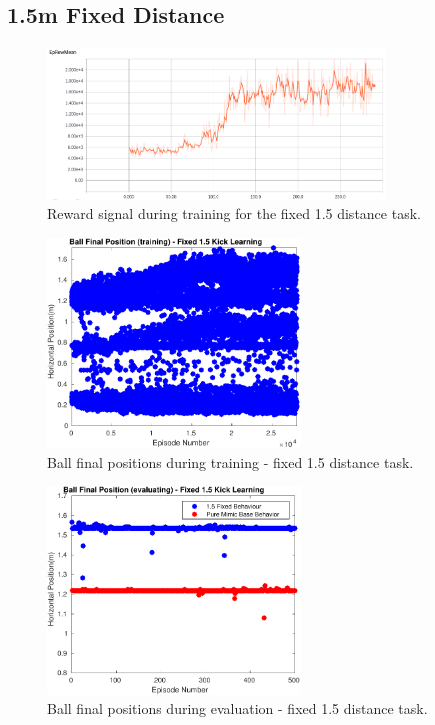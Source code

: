 \subsection{1.5m Fixed Distance}

\begin{figure}[H]
    \centering
    \includegraphics[width=0.8\textwidth]{Chapter7/figures/rew_mean_fix_15.png} 
    \caption{Reward signal during training for the fixed 1.5 distance task.}
    \label{fig:RL_15_kick}
\end{figure}

\begin{figure}[H]
    \centering
    \includegraphics[width=0.6\textwidth]{Chapter7/plots/plot_ball_pos_15fix_kick_train.pdf} 
    \caption{Ball final positions during training - fixed 1.5 distance task.}
    \label{fig:RL_15_kick_pos_train}
\end{figure}

\begin{figure}[H]
    \centering
    \includegraphics[width=0.6\textwidth]{Chapter7/plots/plot_ball_pos_15fix_kick_eval.pdf} 
    \caption{Ball final positions during evaluation - fixed 1.5 distance task.}
    \label{fig:RL_15_kick_pos_eval}
\end{figure}

